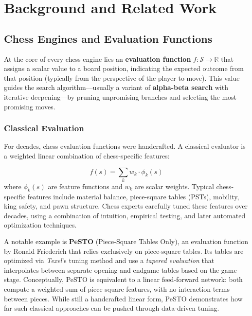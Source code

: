 \chapter{Background and Related Work}







\section{Chess Engines and Evaluation Functions}

At the core of every chess engine lies an \textbf{evaluation function} $f: \mathcal{S} \rightarrow \mathbb{R}$ that assigns a scalar value to a board position, indicating the expected outcome from that position (typically from the perspective of the player to move). This value guides the search algorithm---usually a variant of \textbf{alpha-beta search} with iterative deepening---by pruning unpromising branches and selecting the most promising moves.

\subsection{Classical Evaluation}

For decades, chess evaluation functions were handcrafted. A classical evaluator is a weighted linear combination of chess-specific features:

\[f(s) = \sum_{k} w_k \cdot \phi_k(s)\]
where $\phi_k(s)$ are feature functions and $w_k$ are scalar weights. Typical chess-specific features include material balance, piece-square tables (PSTs), mobility, king safety, and pawn structure. Chess experts carefully tuned these features over decades, using a combination of intuition, empirical testing, and later automated optimization techniques.

A notable example is \textbf{PeSTO} (Piece-Square Tables Only), an evaluation function by Ronald Friederich that relies exclusively on piece-square tables. Its tables are optimized via \emph{Texel}'s tuning method and use a \emph{tapered evaluation} that interpolates between separate opening and endgame tables based on the game stage. Conceptually, PeSTO is equivalent to a linear feed‑forward network: both compute a weighted sum of piece‑square features, with no interaction terms between pieces. While still a handcrafted linear form, PeSTO demonstrates how far such classical approaches can be pushed through data-driven tuning.

